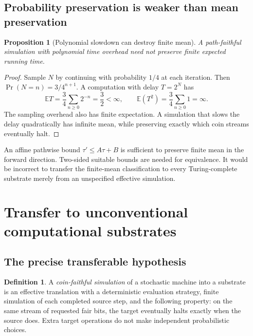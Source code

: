 \documentclass[11pt,letterpaper]{article}
\numberwithin{equation}{section}
\newtheorem{proposition}[theorem]{Proposition}
\theoremstyle{definition}
\newtheorem{definition}[theorem]{Definition}
\theoremstyle{remark}
\newcommand{\Prob}{\Pr}
\newcommand{\srcmark}[1]{\par\noindent{\small\itshape [source~#1]}\par}
\newcommand{\E}{\mathbb E}
\begin{document}
\subsection{Probability preservation is weaker than mean preservation}
\begin{proposition}[Polynomial slowdown can destroy finite mean]
A path-faithful simulation with polynomial time overhead need not
preserve finite expected running time.
\end{proposition}
\begin{proof}
Sample $N$ by continuing with probability $1/4$ at each iteration. Then
$\Prob(N=n)=3/4^{n+1}$. A computation with delay $T=2^N$ has
\[
 \E T=\frac34\sum_{n\ge0}2^{-n}=\frac32<\infty,
 \qquad
 \E(T^2)=\frac34\sum_{n\ge0}1=\infty.
\]
The sampling overhead also has finite expectation. A simulation that
slows the delay quadratically has infinite mean, while preserving exactly
which coin streams eventually halt.
\end{proof}

An affine pathwise bound $\tau'\le A\tau+B$ is sufficient to preserve
finite mean in the forward direction. Two-sided suitable bounds are
needed for equivalence. It would be incorrect to transfer the finite-mean
classification to every Turing-complete substrate merely from an
unspecified effective simulation.

\section{Transfer to unconventional computational substrates}\label{pqc:ql:sec:substrates}
\srcmark{13}

\subsection{The precise transferable hypothesis}
\begin{definition}
A \emph{coin-faithful simulation} of a stochastic machine into a substrate
is an effective translation with a deterministic evaluation strategy,
finite simulation of each completed source step, and the following
property: on the same stream of requested fair bits, the target eventually
halts exactly when the source does. Extra target operations do not make
independent probabilistic choices.
\end{definition}
\end{document}
